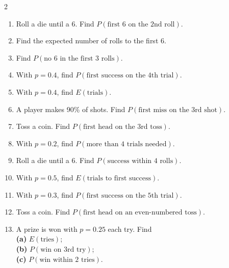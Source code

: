 \documentclass[11pt]{article}
\begin{document}
\clearpage
{}

\begin{recapbox}
\begin{multicols}{2}
\small
\begin{enumerate}[leftmargin=*,itemsep=3pt]
  \item Roll a die until a 6. Find $P(\text{first 6 on the 2nd roll})$.
  \item Find the expected number of rolls to the first 6.
  \item Find $P(\text{no 6 in the first 3 rolls})$.
  \item With $p=0.4$, find $P(\text{first success on the 4th trial})$.
  \item With $p=0.4$, find $E(\text{trials})$.
  \item A player makes 90\% of shots. Find $P(\text{first miss on the 3rd shot})$.
  \item Toss a coin. Find $P(\text{first head on the 3rd toss})$.
  \item With $p=0.2$, find $P(\text{more than 4 trials needed})$.
  \item Roll a die until a 6. Find $P(\text{success within 4 rolls})$.
  \item With $p=0.5$, find $E(\text{trials to first success})$.
  \item With $p=0.3$, find $P(\text{first success on the 5th trial})$.
  \item Toss a coin. Find $P(\text{first head on an even-numbered toss})$.
  \item A prize is won with $p=0.25$ each try. Find \\ \textbf{(a)} $E(\text{tries})$; \\ \textbf{(b)} $P(\text{win on 3rd try})$; \\ \textbf{(c)} $P(\text{win within 2 tries})$.
\end{enumerate}
\end{multicols}
\end{recapbox}
\end{document}
